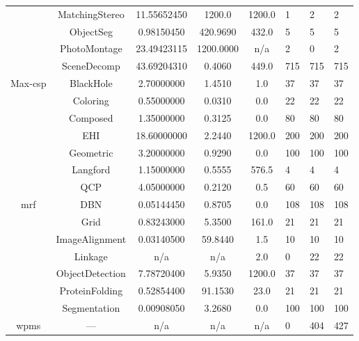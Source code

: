 \begin{table}
\begin{tabu}{ccS[round-mode=places,round-precision=3]
					  S[round-mode=places,round-precision=0]
					  S[round-mode=places,round-precision=0]HHH}
	&	MatchingStereo	&	11.55652450	&	1200.0	&	1200.0	&	1	&	2	&	2 \\
				&	ObjectSeg	&	0.98150450	&	420.9690	&	432.0	&	5	&	5	&	5 \\
				&	PhotoMontage	&	23.49423115	&	1200.0000	&	{n/a}	&	2	&	0	&	2 \\
				&	SceneDecomp	&	43.69204310	&	0.4060	&	449.0	&	715	&	715	&	715 \\
			Max-\acrshort{csp}	&	BlackHole	&	2.70000000	&	1.4510	&	1.0	&	37	&	37	&	37 \\
				&	Coloring	&	0.55000000	&	0.0310	&	0.0	&	22	&	22	&	22 \\
				&	Composed	&	1.35000000	&	0.3125	&	0.0	&	80	&	80	&	80 \\
				&	EHI	&	18.60000000	&	2.2440	&	1200.0	&	200	&	200	&	200 \\
				&	Geometric	&	3.20000000	&	0.9290	&	0.0	&	100	&	100	&	100 \\
				&	Langford	&	1.15000000	&	0.5555	&	576.5	&	4	&	4	&	4 \\
				&	QCP	&	4.05000000	&	0.2120	&	0.5	&	60	&	60	&	60 \\
			\acrshort{mrf}	&	DBN	&	0.05144450	&	0.8705	&	0.0	&	108	&	108	&	108 \\
				&	Grid	&	0.83243000	&	5.3500	&	161.0	&	21	&	21	&	21 \\
	&	ImageAlignment	&	0.03140500	&	59.8440	&	1.5	&	10	&	10	&	10 \\
	&	Linkage	&	{n/a}	&	{n/a}	&	2.0	&	0	&	22	&	22 \\
				&	ObjectDetection	&	7.78720400	&	5.9350	&	1200.0	&	37	&	37	&	37 \\
	&	ProteinFolding	&	0.52854400	&	91.1530	&	23.0	&	21	&	21	&	21 \\
				&	Segmentation	&	0.00908050	&	3.2680	&	0.0	&	100	&	100	&	100 \\
	\acrshort{wpms}	&	---	&	{n/a}	&	{n/a}	&	{n/a}	&	0	&	404	&	427 \\
		\bottomrule
	\end{tabu}
\end{table}
